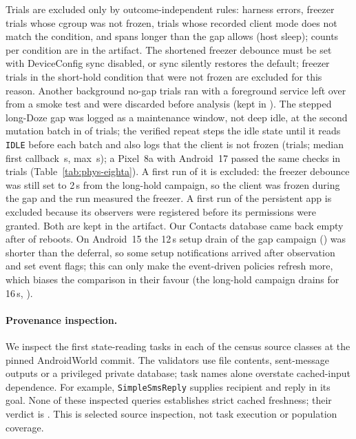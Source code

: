 Trials are excluded only by outcome-independent rules: harness errors, freezer trials whose cgroup was not frozen, trials whose recorded client mode does not match the condition, and spans longer than the gap allows (host sleep); counts per condition are in the artifact. The shortened freezer debounce must be set with DeviceConfig sync disabled, or sync silently restores the default; freezer trials in the short-hold condition that were not frozen are excluded for this reason. Another \ETwoFgsLeftover background no-gap trials ran with a foreground service left over from a smoke test and were discarded before analysis (kept in ). The stepped long-Doze gap was logged as a maintenance window, not deep idle, at the second mutation batch in \DozeMaintTwoLongdoze of \NLongdoze trials; the verified repeat steps the idle state until it reads \texttt{IDLE} before each batch and also logs that the client is not frozen (\NLongdozeTwo trials; median first callback \FclLongdozeTwo\,s, max \FclMaxLongdozeTwo\,s); a Pixel~8a with Android~17 passed the same checks in \PhysEightADozeTrials trials (Table~\ref{tab:phys-eighta}). A first run of it is excluded: the freezer debounce was still set to 2\,s from the long-hold campaign, so the client was frozen during the gap and the run measured the freezer. A first run of the persistent app is excluded because its observers were registered before its permissions were granted. Both are kept in the artifact. Our Contacts database came back empty after \RebootEmpty of \RebootN reboots. On Android~15 the 12\,s setup drain of the gap campaign () was shorter than the deferral, so some setup notifications arrived after observation and set event flags; this can only make the event-driven policies refresh more, which biases the comparison in their favour (the long-hold campaign drains for 16\,s, ).


\paragraph{Provenance inspection.} We inspect the first \RevProvPerClass state-reading tasks in each of the \RevProvClasses census source classes at the pinned AndroidWorld commit. The \RevProvTasks validators use file contents, sent-message outputs or a privileged private database; task names alone overstate cached-input dependence. For example, \texttt{SimpleSmsReply} supplies recipient and reply in its goal. None of these inspected queries establishes strict cached freshness; their verdict is \Unknown. This is selected source inspection, not task execution or population coverage.

